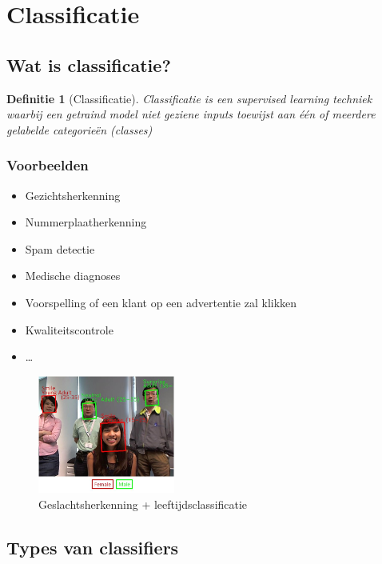 \documentclass{article}
\newtheorem{theorem}{Definitie}[section]
\begin{document}
\section{Classificatie}

\subsection{Wat is classificatie?}

\begin{theorem}[Classificatie]
Classificatie is een supervised learning techniek waarbij een getraind model
niet geziene inputs toewijst aan één of meerdere gelabelde categorieën (classes)
\end{theorem}

\subsubsection{Voorbeelden}

\begin{itemize}
    \item Gezichtsherkenning
    \item Nummerplaatherkenning
    \item Spam detectie
    \item Medische diagnoses
    \item Voorspelling of een klant op een advertentie zal klikken
    \item Kwaliteitscontrole
    \item \dots
\end{itemize}

\begin{figure}[H]
    \centering
    \includegraphics[width=0.4\textwidth]{classificatie-gezichtsherkenning.png}
    \caption{Geslachtsherkenning + leeftijdsclassificatie}
\end{figure}


\subsection{Types van classifiers}
\end{document}

